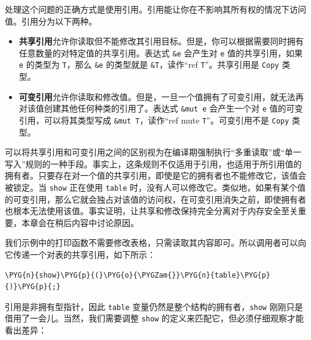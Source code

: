 处理这个问题的正确方式是使用引用。引用能让你在不影响其所有权的情况下访问值。引用分为以下两种。

\begin{itemize}
\item \textbf{共享引用}允许你读取但不能修改其引用目标。但是，你可以根据需要同时拥有任意数量的对特定值的共享引用。表达式 \texttt{\&e} 会产生对 \texttt{e} 值的共享引用，如果 \texttt{e} 的类型为 \texttt{T}，那么 \texttt{\&e} 的类型就是 \texttt{\&T}，读作“ref \texttt{T}”。共享引用是 \texttt{Copy} 类型。
\item \textbf{可变引用}允许你读取和修改值。但是，一旦一个值拥有了可变引用，就无法再对该值创建其他任何种类的引用了。表达式 \texttt{\&mut e} 会产生一个对 \texttt{e} 值的可变引用，可以将其类型写成 \texttt{\&mut T}，读作“ref mute \texttt{T}”。可变引用不是 \texttt{Copy} 类型。
\end{itemize}

可以将共享引用和可变引用之间的区别视为在编译期强制执行“多重读取”或“单一写入”规则的一种手段。事实上，这条规则不仅适用于引用，也适用于所引用值的拥有者。只要存在对一个值的共享引用，即使是它的拥有者也不能修改它，该值会被锁定。当 \texttt{show} 正在使用 \texttt{table} 时，没有人可以修改它。类似地，如果有某个值的可变引用，那么它就会独占对该值的访问权，在可变引用消失之前，即使拥有者也根本无法使用该值。事实证明，让共享和修改保持完全分离对于内存安全至关重要，本章会在稍后内容中讨论原因。

我们示例中的打印函数不需要修改表格，只需读取其内容即可。所以调用者可以向它传递一个对表的共享引用，如下所示：

\begin{Verbatim}[commandchars=\\\{\},breaklines=true,breakanywhere=true,fontsize=\codefont,xleftmargin=17bp]
\PYG{n}{show}\PYG{p}{(}\PYG{o}{\PYGZam{}}\PYG{n}{table}\PYG{p}{)}\PYG{p}{;}
\end{Verbatim}

引用是非拥有型指针，因此 \texttt{table} 变量仍然是整个结构的拥有者，\texttt{show} 刚刚只是借用了一会儿。当然，我们需要调整 \texttt{show} 的定义来匹配它，但必须仔细观察才能看出差异：

